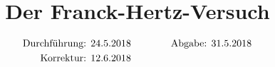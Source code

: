 

\subject{V601}
\title{Der Franck-Hertz-Versuch }

\date{
  \begin{align}
    \text{Durchführung: } & \text{24.5.2018} & \hspace{3em} & \text{Abgabe: 31.5.2018} \notag
\\  \text{Korrektur: } & \text{12.6.2018} & \hspace {3em} & \notag
  \end{align}
}



\maketitle
\thispagestyle{empty}
\tableofcontents
\newpage






\nocite{*}
\printbibliography{}


